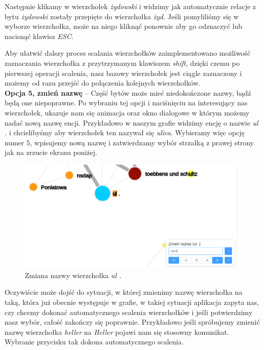 \documentclass[12pt, a4paper]{article}
\begin{document}
Następnie klikamy w wierzchołek \textit{żydowski} i widzimy jak automatycznie relacje z bytu \textit{żydowski} zostały przepięte do wierzchołka \textit{żyd}. Jeśli pomyliliśmy się w wyborze wierzchołka, może na niego kliknąć ponownie aby go odznaczyć lub nacisnąć klawisz \textit{ESC}.

Aby ułatwić dalszy proces scalania wierzchołków zaimplementowano możliwość zaznaczania wierzchołka z przytrzymanym klawiszem \textit{shift}, dzięki czemu po pierwszej operacji scalenia, nasz bazowy wierzchołek jest ciągle zaznaczony i możemy od razu przejść do połączenia kolejnych wierzchołków.\\

\noindent \textbf{Opcja 5, zmień nazwę} -- Część bytów może mieć niedokończone nazwy, bądź będą one niepoprawne. Po wybraniu tej opcji i naciśnięciu na interesujący nas wierzchołek, ukazuje nam się animacja oraz okno dialogowe w którym możemy nadać nową nazwę encji. Przykładowo w naszym grafie widzimy encję o nazwie \textit{ul .} i chcielibyśmy aby wierzchołek ten nazywał się \textit{ulica}. Wybieramy więc opcję numer $5$, wpisujemy nową nazwę i zatwierdzamy wybór strzałką z prawej strony jak na zrzucie ekranu poniżej.

\begin{figure}[H]
    \centering
    \includegraphics[width=\linewidth]{images/graph-ulica.png}
    \caption{Zmiana nazwy wierzchołka \textit{ul .}}
\end{figure}

Oczywiście może dojść do sytuacji, w której zmienimy nazwę wierzchołka na taką, która już obecnie występuje w grafie, w takiej sytuacji aplikacja zapyta nas, czy chcemy dokonać automatycznego scalenia wierzchołków i jeśli potwierdzimy nasz wybór, całość zakończy się poprawnie. Przykładowo jeśli spróbujemy zmienić nazwę wierzchołka \textit{heller} na \textit{Heller} pojawi nam się stosowny komunikat. Wybranie przycisku tak dokona automatycznego scalenia.
\end{document}
